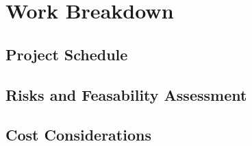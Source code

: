 \chapter{Work Breakdown}

\section{Project Schedule}

\section{Risks and Feasability Assessment}

\section{Cost Considerations}
